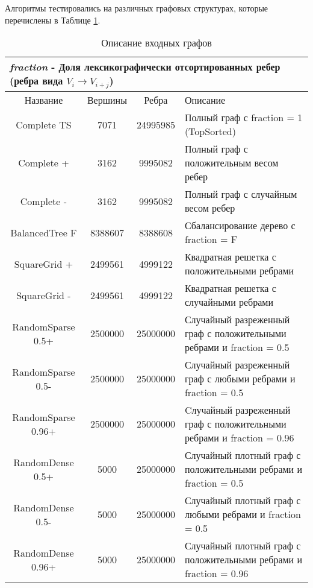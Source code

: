 Алгоритмы тестировались на различных графовых структурах, которые перечислены в Таблице \ref{bf_algo_comparison}. 
\FloatBarrier
\begin{table}[H]
\centering
\caption{Описание входных графов}

\begin{tabular}{c | c | c | l}  
\multicolumn{4}{l}{\footnotesize \textit{fraction} - Доля лексикографически отсортированных ребер (ребра вида $V_i \rightarrow V_{i+j}$) }\\
\hline
Название & Вершины & Ребра & Описание\\
\hline\hline
Complete TS & 7071 & 24995985 & Полный граф с fraction = 1 (TopSorted)\\  
Complete + & 3162 & 9995082 & Полный граф с положительным весом ребер \\  
Complete - & 3162 & 9995082 & Полный граф с случайным весом ребер \\  
BalancedTree F & 8388607 & 8388608 & Сбалансирование дерево с fraction = F \\  
SquareGrid + & 2499561 & 4999122 & Квадратная решетка с положительными ребрами \\  
SquareGrid - & 2499561 & 4999122 & Квадратная решетка с случайными ребрами \\  
RandomSparse 0.5+ & 2500000 & 25000000 & \pbox{9cm}{Случайный разреженный граф с положительными ребрами и fraction = 0.5\\}  \\  
RandomSparse 0.5- & 2500000 & 25000000 & \pbox{9cm}{Случайный разреженный граф с любыми ребрами и fraction = 0.5\\}  \\  
RandomSparse 0.96+ & 2500000 & 25000000 & \pbox{9cm}{Cлучайный разреженный граф с положительными ребрами и fraction = 0.96\\} \\  
RandomDense 0.5+ & 5000 & 25000000 & \pbox{9cm}{Случайный плотный граф с положительными ребрами и fraction = 0.5\\}  \\  
RandomDense 0.5- & 5000 & 25000000 & \pbox{9cm}{Случайный плотный граф с любыми ребрами и fraction = 0.5\\}  \\  
RandomDense 0.96+ & 5000 & 25000000 & \pbox{9cm}{Случайный плотный граф с положительными ребрами и fraction = 0.96\\}  \\  
\hline

\end{tabular}

\label{bf_algo_comparison}
\end{table}
